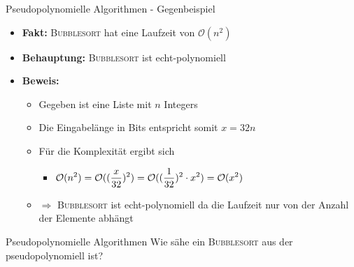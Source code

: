 \begin{frame}{Pseudopolynomielle Algorithmen - Gegenbeispiel}
    \begin{itemize}
        \item \textbf{Fakt:} \textsc{Bubblesort} hat eine Laufzeit von $\mathcal{O}(n^2)$
        \item \textbf{Behauptung:} \textsc{Bubblesort} ist echt-polynomiell
        \item \textbf{Beweis:}
        \begin{itemize}
            \item Gegeben ist eine Liste mit $n$ Integers
            \item Die Eingabelänge in Bits entspricht somit $x=32n$
            \item Für die Komplexität ergibt sich
            \begin{itemize}
                \item $\displaystyle \mathcal{O}(n^2) = \mathcal{O}((\frac{x}{32})^2) = \mathcal{O}((\frac{1}{32})^2 \cdot x^2) = \mathcal{O}(x^2)$      
            \end{itemize}
            \item[] $\Rightarrow$ \textsc{Bubblesort} ist echt-polynomiell da die Laufzeit nur von der Anzahl der Elemente abhängt
        \end{itemize}
    \end{itemize}
\end{frame}

\begin{frame}{Pseudopolynomielle Algorithmen}
    Wie sähe ein \textsc{Bubblesort} aus der pseudopolynomiell ist?
\end{frame}

